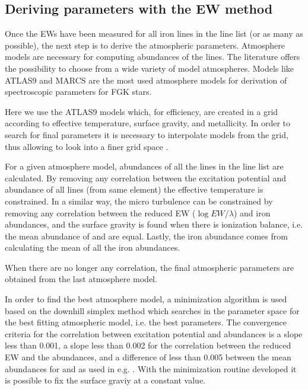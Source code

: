 \documentclass{aa}
\begin{document}
\subsection{Deriving parameters with the EW method}
\label{sec:deriving_parameters_with_the_ew_method}

Once the EWs have been measured for all iron lines in the line list (or as
many as possible), the next step is to derive the atmospheric parameters.
Atmosphere models are necessary for computing abundances of the lines.
The literature offers the possibility to choose from a wide variety
of model atmospheres. Models like ATLAS9 \citep{Kurucz1993} and
MARCS \citep{Gustafson2008} are the most used atmosphere models for
derivation of spectroscopic parameters for FGK stars.

Here we use the ATLAS9 models which, for efficiency, are created
in a grid according to effective temperature, surface gravity, and
metallicity. In order to search for final parameters it is necessary to
interpolate models from the grid, thus allowing to look into a finer
grid space \citep[see e.g.][]{Sousa2014}.

For a given atmosphere model, abundances of all the lines in the line
list are calculated. By removing any correlation between the excitation
potential and abundance of all lines (from same element) the effective
temperature is constrained. In a similar way, the micro turbulence
can be constrained by removing any correlation between the reduced EW
($\log EW/\lambda$) and iron abundances, and the surface gravity is
found when there is ionization balance, i.e. the mean abundance of
 and  are equal. Lastly, the iron abundance comes
from calculating the mean of all the iron abundances.

When there are no longer any correlation, the final atmospheric
parameters are obtained from the last atmosphere model.

In order to find the best atmosphere model, a minimization algorithm
is used based on the downhill simplex method \citep{Press1992}
which searches in the parameter space for the best fitting atmospheric
model, i.e. the best parameters.
The convergence criteria for the correlation between excitation
potential and abundances is a slope less than 0.001, a slope
less than 0.002 for the correlation between the reduced EW and
the abundances, and a difference of less than 0.005 between the
mean abundances for  and  as used in e.g.
\citet{Tsantaki2013,Sousa2008a}. With the minimization routine
developed it is possible to fix the surface graviy at a constant value.
\end{document}
